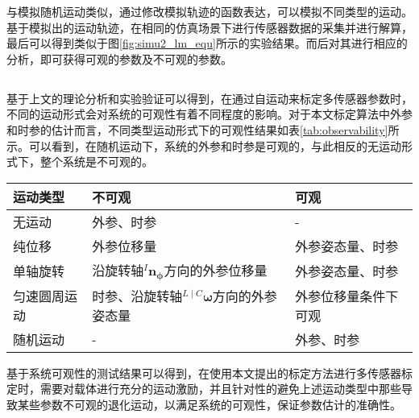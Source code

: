 与模拟随机运动类似，通过修改模拟轨迹的函数表达，可以模拟不同类型的运动。基于模拟出的运动轨迹，在相同的仿真场景下进行传感器数据的采集并进行解算，最后可以得到类似于图\ref{fig:simu2_lm_equ}所示的实验结果。而后对其进行相应的分析，即可获得可观的参数及不可观的参数。

\subsection{}
基于上文的理论分析和实验验证可以得到，在通过自运动来标定多传感器参数时，不同的运动形式会对系统的可观性有着不同程度的影响。对于本文标定算法中外参和时参的估计而言，不同类型运动形式下的可观性结果如表\ref{tab:observability}所示。可以看到，在随机运动下，系统的外参和时参是可观的，与此相反的无运动形式下，整个系统是不可观的。
\begin{table*}[htbp]
  \centering
  \caption{}
  \label{tab:observability}
  \normf
  \begin{tabular}{l|ll}
    \hline
    {运动类型}     & {不可观}                                                             & {可观}                 \\ \hline
    {无运动}       & {外参、时参}                                                         & {-}                    \\
    {纯位移}       & {外参位移量}                                                         & {外参姿态量、时参}     \\
    {单轴旋转}     & {沿旋转轴${^{I}\boldsymbol{n}_{\boldsymbol{\phi}}}$方向的外参位移量} & {外参姿态量、时参}     \\
    {匀速圆周运动} & {时参、沿旋转轴${^{L\mid C}\boldsymbol{\omega}}$方向的外参姿态量}    & {外参位移量条件下可观} \\
    {随机运动}     & {-}                                                                  & {外参、时参}           \\
    \hline
  \end{tabular}
\end{table*}

基于系统可观性的测试结果可以得到，在使用本文提出的标定方法进行多传感器标定时，需要对载体进行充分的运动激励，并且针对性的避免上述运动类型中那些导致某些参数不可观的退化运动，以满足系统的可观性，保证参数估计的准确性。
